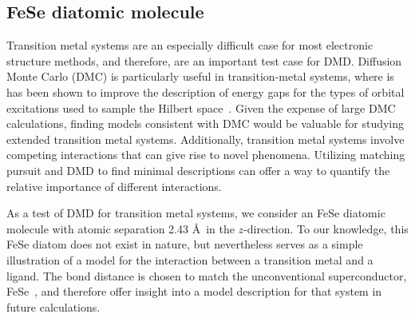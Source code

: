 \subsection{FeSe diatomic molecule}
\label{subsection:fese}
Transition metal systems are an especially difficult case for most electronic structure methods, and therefore, are an 
important test case for DMD. 
Diffusion Monte Carlo (DMC) is particularly useful in transition-metal systems, where is has been shown to improve the description of energy gaps for the types of orbital excitations used to sample the Hilbert space~\cite{Foyevtsova2014, Wagner_Abbamonte, Zheng2015, Wagner2016}.
Given the expense of large DMC calculations, finding models consistent with DMC would be valuable for studying extended transition metal systems. 
Additionally, transition metal systems involve competing interactions that can give rise to novel phenomena. 
Utilizing matching pursuit and DMD to find minimal descriptions can offer a way to quantify the relative importance of different interactions.

As a test of DMD for transition metal systems, we consider an FeSe diatomic molecule with atomic separation 2.43 \AA~in the $z$-direction.
To our knowledge, this FeSe diatom does not exist in nature, but nevertheless serves as a simple illustration of a model for the interaction between a transition metal and a ligand. 
The bond distance is chosen to match the unconventional superconductor, FeSe~\cite{kumar_crystal_2010}, and therefore offer insight into a model description for that system in future calculations.


